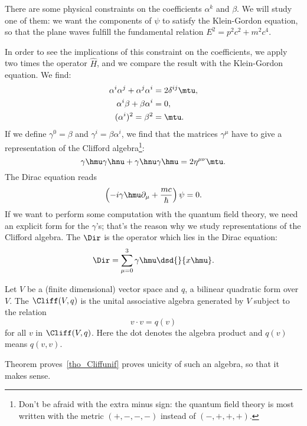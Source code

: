 There are some physical constraints on the coefficients $\alpha^k$ and $\beta$. We will study one of them: we want the components of $\psi$ to satisfy the Klein-Gordon equation, so that the plane waves fulfill the fundamental relation $E^2=p^2c^2+m^2c^4$.

In order to see the implications of this constraint on the coefficients, we apply two times the operator $\hat{H}$, and we compare the result with the Klein-Gordon equation. We find:
\begin{subequations}
\begin{align}
 \alpha^i\alpha^j+\alpha^j\alpha^i&=2\delta^{ij}\mtu,\\
 \alpha^i\beta+\beta\alpha^i&=0,\\
 (\alpha^i)^2=\beta^2&=\mtu.
\end{align}
\end{subequations}
%
If we define $\gamma^0=\beta$ and $\gamma^i=\beta\alpha^i$, we find that the matrices $\gamma^{\mu}$ have to give a representation of the Clifford algebra\footnote{Don't be afraid with the extra minus sign: the quantum field theory is most written with the metric $(+,-,-,-)$ instead of $(-,+,+,+)$.}:
\begin{equation}\label{cliffphys}
	\gamma\hmu\gamma\hnu+\gamma\hnu\gamma\hmu=2\eta^{\mu\nu}\mtu.
\end{equation}
The Dirac equation reads
\[
\left(-i\gamma\hmu\partial_{\mu}+\frac{mc}{\hbar}\right)\psi=0.
\]
If we want to perform some computation with the quantum field theory, we need an explicit form for the $\gamma$'s; that's the reason why we study representations of the Clifford algebra. The  $\Dir$ is the operator which lies in the Dirac equation:
\begin{equation}
 \label{dirflat}\Dir=\sum_{\mu=0}^3\gamma\hmu\dsd{}{x\hmu}.
\end{equation}


\begin{definition}
Let $V$ be a (finite dimensional) vector space and $q$, a bilinear quadratic form over $V$. The  $\Cliff(V,q)$ is the unital associative algebra generated by $V$ subject to the relation
\begin{equation}\label{501r1}
       v\cdot v=q(v)
\end{equation}
for all $v$ in $\Cliff(V,q)$. Here the dot denotes the algebra product and $q(v)$ means $q(v,v)$.
\end{definition}
Theorem proves~\ref{tho_Cliffunif} proves unicity of such an algebra, so that it makes sense.

